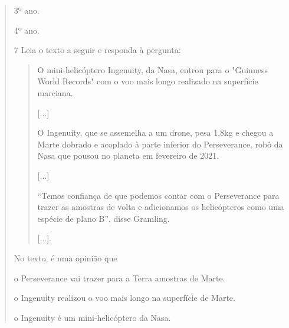 \begin{quote}
\begin{escolha}
\item 3º ano.

\item 4º ano.
\end{escolha}


\num{7} Leia o texto a seguir e responda à pergunta:

\begin{quote}
O mini-helicóptero Ingenuity, da Nasa, entrou para o "Guinness World
Records" com o voo mais longo realizado na superfície marciana.

{[}...{]}

O Ingenuity, que se assemelha a um drone, pesa 1,8kg e chegou a Marte
dobrado e acoplado à parte inferior do Perseverance, robô da Nasa que
pousou no planeta em fevereiro de 2021.

{[}...{]}

``Temos confiança de que podemos contar com o Perseverance para trazer
as amostras de volta e adicionamos os helicópteros como uma espécie de
plano B'', disse Gramling.

{[}...{]}.

\end{quote}

No texto, é uma opinião que

\begin{escolha}
\item o Perseverance vai trazer para a Terra amostras de Marte.

\item o Ingenuity realizou o voo mais longo na superfície de Marte.

\item o Ingenuity é um mini-helicóptero da Nasa.


\end{escolha}
\end{quote}
